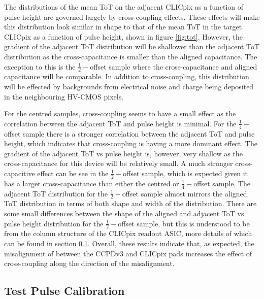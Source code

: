 The distributions of the mean ToT on the adjacent CLICpix as a function of pulse height are governed largely by cross-coupling effects.  These effects will make this distribution look similar in shape to that of the mean ToT in the target CLICpix as a function of pulse height, shown in figure \ref{fig:tot}.  However, the gradient of the adjacent ToT distribution will be shallower than the adjacent ToT distribution as the cross-capacitance is smaller than the aligned capacitance.  The exception to this is the $\frac{1}{2}-$offset sample where the cross-capacitance and aligned capacitance will be comparable.  In addition to cross-coupling, this distribution will be effected by backgrounds from electrical noise and charge being deposited in the neighbouring HV-CMOS pixels.  

For the centred samples, cross-coupling seems to have a small effect as the correlation between the adjacent ToT and pulse height is minimal.  For the $\frac{1}{4}-$offset sample there is a stronger correlation between the adjacent ToT and pulse height, which indicates that cross-coupling is having a more dominant effect.  The gradient of the adjacent ToT vs pulse height is, however, very shallow as the cross-capacitance for this device will be relatively small.  A much stronger cross-capacitive effect can be see in the $\frac{1}{2}-$offset sample, which is expected given it has a larger cross-capacitance than either the centred or $\frac{1}{4}-$offset sample.  The adjacent ToT distribution for the $\frac{1}{2}-$offset sample almost mirrors the aligned ToT distribution in terms of both shape and width of the distribution.  There are some small differences between the shape of the aligned and adjacent ToT vs pulse height distribution for the $\frac{1}{2}-$offset sample, but this is understood to be from the column structure of the CLICpix readout ASIC, more details of which can be found in section \ref{sec:testpulsecalibration}.  Overall, these results indicate that, as expected, the misalignment of between the CCPDv3 and CLICpix pads increases the effect of cross-coupling along the direction of the misalignment.


\subsection{Test Pulse Calibration}
\label{sec:testpulsecalibration}

